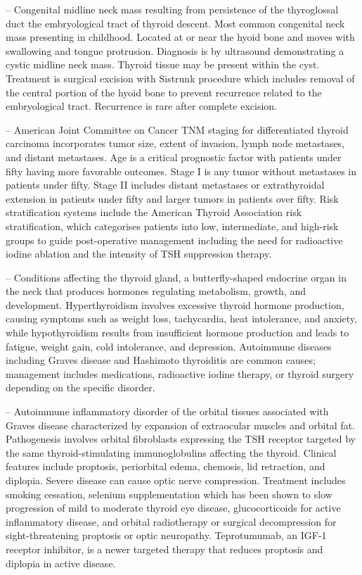 -- Congenital midline neck mass resulting from persistence of the thyroglossal duct the embryological tract of thyroid descent. Most common congenital neck mass presenting in childhood. Located at or near the hyoid bone and moves with swallowing and tongue protrusion. Diagnosis is by ultrasound demonstrating a cystic midline neck mass. Thyroid tissue may be present within the cyst. Treatment is surgical excision with Sistrunk procedure which includes removal of the central portion of the hyoid bone to prevent recurrence related to the embryological tract. Recurrence is rare after complete excision.

-- American Joint Committee on Cancer TNM staging for differentiated thyroid carcinoma incorporates tumor size, extent of invasion, lymph node metastases, and distant metastases. Age is a critical prognostic factor with patients under fifty having more favorable outcomes. Stage I is any tumor without metastases in patients under fifty. Stage II includes distant metastases or extrathyroidal extension in patients under fifty and larger tumors in patients over fifty. Risk stratification systems include the American Thyroid Association risk stratification, which categorises patients into low, intermediate, and high-risk groups to guide post-operative management including the need for radioactive iodine ablation and the intensity of TSH suppression therapy.

-- Conditions affecting the thyroid gland, a butterfly-shaped endocrine organ in the neck that produces hormones regulating metabolism, growth, and development. Hyperthyroidism involves excessive thyroid hormone production, causing symptoms such as weight loss, tachycardia, heat intolerance, and anxiety, while hypothyroidism results from insufficient hormone production and leads to fatigue, weight gain, cold intolerance, and depression. Autoimmune diseases including Graves disease and Hashimoto thyroiditis are common causes; management includes medications, radioactive iodine therapy, or thyroid surgery depending on the specific disorder.

-- Autoimmune inflammatory disorder of the orbital tissues associated with Graves disease characterized by expansion of extraocular muscles and orbital fat. Pathogenesis involves orbital fibroblasts expressing the TSH receptor targeted by the same thyroid-stimulating immunoglobulins affecting the thyroid. Clinical features include proptosis, periorbital edema, chemosis, lid retraction, and diplopia. Severe disease can cause optic nerve compression. Treatment includes smoking cessation, selenium supplementation which has been shown to slow progression of mild to moderate thyroid eye disease, glucocorticoids for active inflammatory disease, and orbital radiotherapy or surgical decompression for sight-threatening proptosis or optic neuropathy. Teprotumumab, an IGF-1 receptor inhibitor, is a newer targeted therapy that reduces proptosis and diplopia in active disease.

